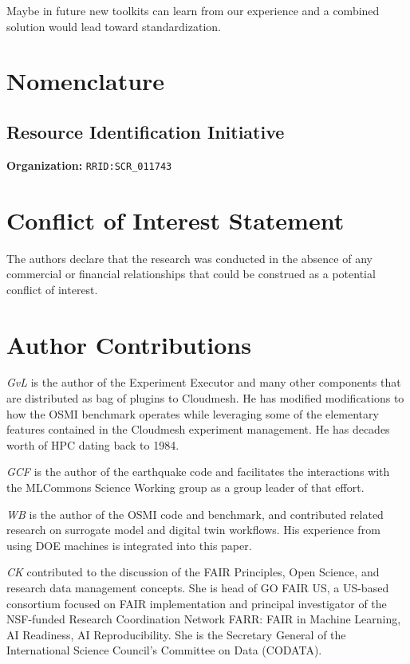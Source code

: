 \documentclass[utf8]{FrontiersinVancouver} %
\begin{document}
Maybe in future new toolkits can learn from our experience and a combined solution would lead toward standardization. 


\clearpage

\section{Nomenclature}

\subsection{Resource Identification Initiative}

{\bf Organization:} \verb|RRID:SCR_011743|

\section*{Conflict of Interest Statement}

The authors declare that the research was conducted in the absence of any commercial or financial relationships that could be construed as a potential conflict of interest.

\section*{Author Contributions}

{\em GvL} is the author of the Experiment Executor and many other components that are distributed as bag of plugins to Cloudmesh.  He has modified modifications to how the OSMI benchmark operates while leveraging some of the elementary features contained in the Cloudmesh experiment management. He has decades worth of HPC dating back to 1984. 

{\em GCF} is the author of the earthquake code and facilitates the interactions with the MLCommons Science Working group as a group leader of that effort. 


{\em WB} is the author of the OSMI code and benchmark, and contributed related research on surrogate model and digital twin workflows. His experience from using DOE machines is integrated into this paper.

{\em CK} contributed to the discussion of the FAIR Principles, Open Science, and research data management concepts. She is head of GO FAIR US, a US-based consortium focused on FAIR implementation and principal investigator of the NSF-funded Research Coordination Network FARR: FAIR in Machine Learning, AI Readiness, AI Reproducibility. She is the Secretary General of the International Science Council's Committee on Data (CODATA).
\end{document}
